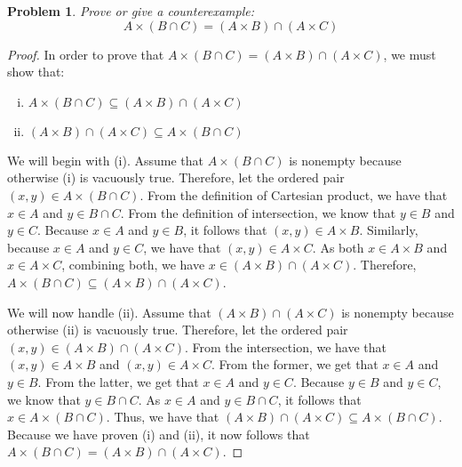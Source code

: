 \documentclass{article}
\newtheorem{problem}{Problem}
\begin{document}
\pagebreak

\begin{problem}
 Prove or give a counterexample: 
$$A \times \left(B \cap C \right) = \left(A \times B \right) \cap \left( A \times C \right)$$
\end{problem}
\begin{proof}
In order to prove that $A \times \left(B \cap C \right) = \left(A \times B \right) \cap \left( A \times C \right)$, we must show that:
\begin{enumerate}[(i)]
    \item  $ A \times \left(B \cap C \right) \subseteq \left(A \times B \right) \cap \left( A \times C \right)$ 
    \item $\left(A \times B \right) \cap \left( A \times C \right) \subseteq A \times \left(B \cap C \right)$
\end{enumerate}
We will begin with (i). Assume that $A \times \left(B \cap C \right)$ is nonempty because otherwise (i) is vacuously true. Therefore, let the ordered pair $(x,y) \in A \times \left(B \cap C \right)$. From the definition of Cartesian product, we have that $x \in A$ and $y \in B \cap C$. From the definition of intersection, we know that $y \in B$ and $y \in C$. Because $x \in A$ and $y \in B$, it follows that $(x, y) \in A \times B$. Similarly, because $x \in A$ and $y \in C$, we have that $(x, y) \in A \times C$. As both $x \in A \times B$ and $x \in A \times C$, combining both, we have $x \in \left(A \times B \right) \cap \left( A \times C \right)$. Therefore, $ A \times \left(B \cap C \right) \subseteq \left(A \times B \right) \cap \left( A \times C \right)$.

We will now handle (ii). Assume that $\left(A \times B \right) \cap \left( A \times C \right)$ is nonempty because otherwise (ii) is vacuously true. Therefore, let the ordered pair $(x,y) \in \left(A \times B \right) \cap \left( A \times C \right)$. From the intersection, we have that $(x, y) \in A \times B$ and $(x, y) \in A \times C$. From the former, we get that $x \in A$ and $y \in B$. From the latter, we get that $x \in A$ and $y \in C$. Because $y \in B$ and $y \in C$, we know that $y \in B \cap C$. As $x \in A$ and $y \in B \cap C$, it follows that $x \in A \times \left(B \cap C \right)$. Thus, we have that $\left(A \times B \right) \cap \left( A \times C \right) \subseteq A \times \left(B \cap C \right)$. Because we have proven (i) and (ii), it now follows that $A \times \left(B \cap C \right) = \left(A \times B \right) \cap \left( A \times C \right)$.
\end{proof}
\end{document}
